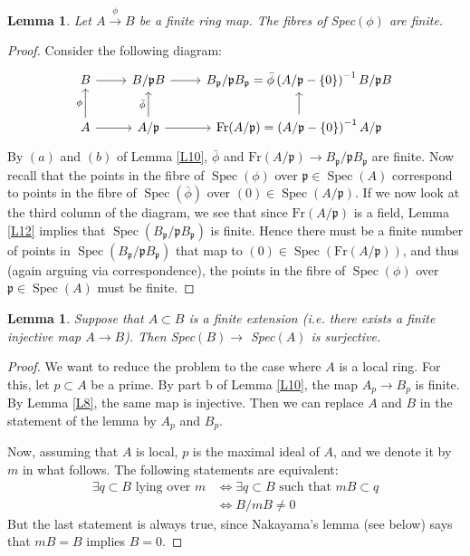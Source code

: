 \documentclass{article}
\newcommand{\fr}{\mathfrak}
\DeclareMathOperator{\Spec}{Spec}
\theoremstyle{plain}
\newtheorem{lem}[thm]{Lemma}
\theoremstyle{definition}
\theoremstyle{remark}
\begin{document}
\begin{lem}
\label{L14}
Let $A \overset{\phi}{\to} B$ be a finite ring map. The fibres of Spec$(\phi)$ are finite.
\end{lem}
\begin{proof}
Consider the following diagram:
\[
\begin{tikzcd}
B\arrow{r}&B/\fr pB\arrow{r} & B_\fr p/\fr pB_\fr p=\bar\phi\left(A/\fr p-\{0\}\right)^{-1}B/\fr pB\\
A\arrow{r}\arrow{u}{\phi} & A/\fr p\arrow{r}\arrow{u}{\bar\phi}&\text{Fr}(A/\fr p)=\left(A/\fr p-\{0\}\right)^{-1}A/\fr p\arrow{u}
\end{tikzcd}
\]
By $(a)$ and $(b)$ of Lemma \ref{L10}, $\bar\phi$ and $\text{Fr}(A/\fr p)\to B_\fr p/\fr pB_\fr p$ are finite. Now recall that the points in the fibre of $\Spec(\phi)$ over $\fr p\in\Spec(A)$ correspond to points in the fibre of $\Spec(\bar \phi)$ over $(0)\in\Spec(A/\fr p)$. If we now look at the third column of the diagram, we see that since $\text{Fr}(A/\fr p)$ is a field, Lemma \ref{L12} implies that $\Spec(B_\fr p/\fr pB_\fr p)$ is finite. Hence there must be a finite number of points in $\Spec(B_\fr p/\fr pB_\fr p)$ that map to $(0)\in\Spec(\text{Fr}(A/\fr p))$, and thus (again arguing via correspondence), the points in the fibre of $\Spec(\phi)$ over $\fr p\in\Spec(A)$ must be finite.
\end{proof}

\begin{lem}
\label{L15}
Suppose that $A\subset B$ is a finite extension (i.e. there exists a finite injective map $A\to B$). Then Spec$(B) \to $ Spec$(A)$ is surjective.
\end{lem}
\begin{proof}
We want to reduce the problem to the case where $A$ is a local ring. For this, let $p\subset A$ be a prime. By part b of Lemma \ref{L10}, the map $A_p \to B_p$ is finite. By Lemma \ref{L8}, the same map is injective. Then we can replace $A$ and $B$ in the statement of the lemma by $A_p$ and $B_p$.

Now, assuming that $A$ is local, $p$ is the maximal ideal of $A$, and we denote it by $m$ in what follows. The following statements are equivalent:
\begin{align*}
 \exists q \subset B \text{ lying over } m &\Leftrightarrow \exists q\subset B \text{ such that } mB \subset q
 \\   & \Leftrightarrow B/mB \neq 0
\end{align*}
But the last statement is always true, since Nakayama's lemma (see below) says that $mB = B$ implies $B = 0$.
\end{proof}
\end{document}
